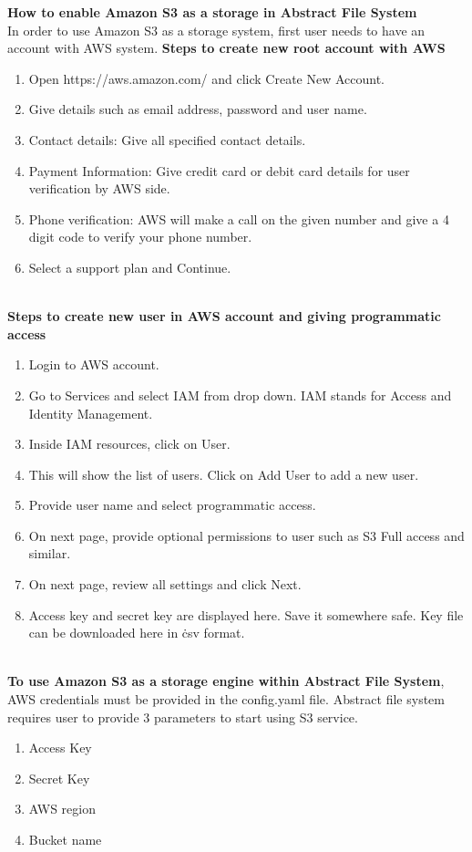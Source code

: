 \textbf{How to enable Amazon S3 as a storage in Abstract File System}\\
In order to use Amazon S3 as a storage system, first user needs to have an
account with AWS system.
\textbf{Steps to create new root account with AWS}\\
\begin{enumerate}
    \item Open https://aws.amazon.com/ and click Create New Account.
    \item Give details such as email address, password and user name.
    \item Contact details: Give all specified contact details.
    \item Payment Information: Give credit card or debit card details for user
verification by AWS side.
    \item       Phone verification: AWS will make a call on the given number
and give a 4 digit code to verify your phone number.
    \item Select a support plan and Continue.
\end{enumerate}
\\
\textbf{Steps to create new user in AWS account and giving programmatic access}
\\
\begin{enumerate}
    \item Login to AWS account.
    \item Go to Services and select IAM from drop down. 
	IAM stands for Access and Identity Management.
    \item Inside IAM resources, click on User.
    \item This will show the list of users. Click on Add User to add a new user.
    \item Provide user name and select programmatic access.
    \item On next page, provide optional permissions to user such as S3 Full
access and similar.
    \item On next page, review all settings and click Next.
    \item Access key and secret key are displayed here. Save it somewhere safe.
Key file can be downloaded here in \.csv format.
\end{enumerate}
\\

\textbf{To use Amazon S3 as a storage engine within Abstract File System}, AWS
credentials must be provided in the config.yaml file.
Abstract file system requires user to provide 3 parameters to start using S3
service.
\begin{enumerate}
 \item  Access Key
 \item  Secret Key
 \item  AWS region
 \item  Bucket name
\end{enumerate}

